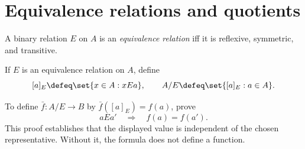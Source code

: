 \section{Equivalence relations and quotients}
\label{sec:set-prerequisites-04}

\begin{definition}
A binary relation \(E\) on \(A\) is an \emph{equivalence relation} iff it is
reflexive, symmetric, and transitive.
\end{definition}

\begin{definition}
If \(E\) is an equivalence relation on \(A\), define
\[
  [a]_E\defeq\set{x\in A:xEa},
  \qquad
  A/E\defeq\set{[a]_E:a\in A}.
\]
\end{definition}

\begin{method}
To define \(\bar f:A/E\to B\) by \(\bar f([a]_E)=f(a)\), prove
\[
  aEa'\quad\Longrightarrow\quad f(a)=f(a').
\]
This proof establishes that the displayed value is independent of the chosen
representative.  Without it, the formula does not define a function.
\end{method}

